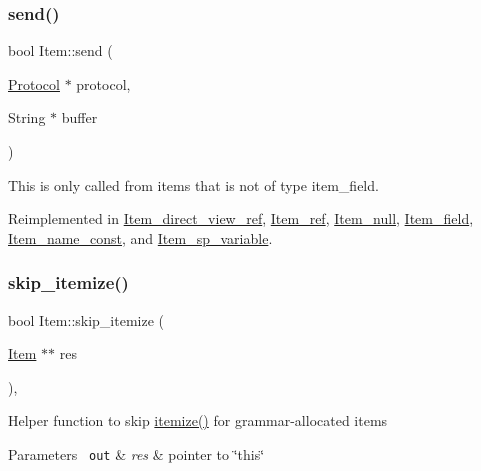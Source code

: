 \subsubsection{\texorpdfstring{send()}{send()}}
{\footnotesize\ttfamily bool Item\+::send (\begin{DoxyParamCaption}\item[{\mbox{\hyperlink{classProtocol}{Protocol}} $\ast$}]{protocol,  }\item[{String $\ast$}]{buffer }\end{DoxyParamCaption})\hspace{0.3cm}{\ttfamily [virtual]}}

This is only called from items that is not of type item\+\_\+field. 

Reimplemented in \mbox{\hyperlink{classItem__direct__view__ref_a29104c4d5e1f37059a1b0e357bb0cfc9}{Item\+\_\+direct\+\_\+view\+\_\+ref}}, \mbox{\hyperlink{classItem__ref_a8a0631a3f2c781f2215d220df1e80869}{Item\+\_\+ref}}, \mbox{\hyperlink{classItem__null_abda34e2df5b301b98193bf38b0766f15}{Item\+\_\+null}}, \mbox{\hyperlink{classItem__field_aecd4c06e61ad49121f428f7156cd0dfb}{Item\+\_\+field}}, \mbox{\hyperlink{classItem__name__const_a11b5077653b428797e7f9ca7e5237eec}{Item\+\_\+name\+\_\+const}}, and \mbox{\hyperlink{classItem__sp__variable_a0995ce9203747eca85eff9aca948e131}{Item\+\_\+sp\+\_\+variable}}.

\mbox{\label{classItem_a0630371e331f83a8d258952a52cc5c72}} 
\subsubsection{\texorpdfstring{skip\+\_\+itemize()}{skip\_itemize()}}
{\footnotesize\ttfamily bool Item\+::skip\+\_\+itemize (\begin{DoxyParamCaption}\item[{\mbox{\hyperlink{classItem}{Item}} $\ast$$\ast$}]{res }\end{DoxyParamCaption})\hspace{0.3cm}{\ttfamily [inline]}, {\ttfamily [protected]}}

Helper function to skip \mbox{\hyperlink{classItem_a0757839d09aa77bfd92bfe071f257ae9}{itemize()}} for grammar-\/allocated items


\begin{DoxyParams}[1]{Parameters}
\mbox{\texttt{ out}}  & {\em res} & pointer to \char`\"{}this\char`\"{}\\
\hline
\end{DoxyParams}

